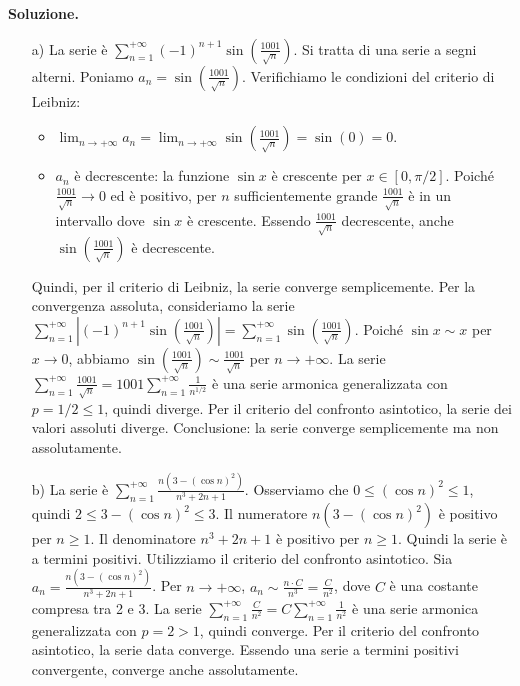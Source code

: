 \documentclass[12pt, a4paper]{article}
\newenvironment{solution}{%
    \par\noindent\textbf{Soluzione.}\medskip\par
    \normalfont
}{\par\bigskip}
\begin{document}
\begin{solution}
\begin{enumerate}
    \item[a)] La serie è $\displaystyle\sum_{n=1}^{+\infty} (-1)^{n+1} \sin\left(\frac{1001}{\sqrt{n}}\right)$.
    Si tratta di una serie a segni alterni. Poniamo $a_n = \sin\left(\frac{1001}{\sqrt{n}}\right)$.
    Verifichiamo le condizioni del criterio di Leibniz:
    \begin{itemize}
        \item $\lim_{n\to+\infty} a_n = \lim_{n\to+\infty} \sin\left(\frac{1001}{\sqrt{n}}\right) = \sin(0) = 0$.
        \item $a_n$ è decrescente: la funzione $\sin x$ è crescente per $x \in [0, \pi/2]$. Poiché $\frac{1001}{\sqrt{n}} \to 0$ ed è positivo, per $n$ sufficientemente grande $\frac{1001}{\sqrt{n}}$ è in un intervallo dove $\sin x$ è crescente. Essendo $\frac{1001}{\sqrt{n}}$ decrescente, anche $\sin\left(\frac{1001}{\sqrt{n}}\right)$ è decrescente.
    \end{itemize}
    Quindi, per il criterio di Leibniz, la serie converge semplicemente.
    Per la convergenza assoluta, consideriamo la serie $\displaystyle\sum_{n=1}^{+\infty} \left|(-1)^{n+1} \sin\left(\frac{1001}{\sqrt{n}}\right)\right| = \sum_{n=1}^{+\infty} \sin\left(\frac{1001}{\sqrt{n}}\right)$.
    Poiché $\sin x \sim x$ per $x \to 0$, abbiamo $\sin\left(\frac{1001}{\sqrt{n}}\right) \sim \frac{1001}{\sqrt{n}}$ per $n \to +\infty$.
    La serie $\displaystyle\sum_{n=1}^{+\infty} \frac{1001}{\sqrt{n}} = 1001 \sum_{n=1}^{+\infty} \frac{1}{n^{1/2}}$ è una serie armonica generalizzata con $p=1/2 \le 1$, quindi diverge.
    Per il criterio del confronto asintotico, la serie dei valori assoluti diverge.
    Conclusione: la serie converge semplicemente ma non assolutamente.

    \item[b)] La serie è $\displaystyle\sum_{n=1}^{+\infty} \frac{n(3-(\cos n)^{2})}{n^{3}+2n+1}$.
    Osserviamo che $0 \le (\cos n)^2 \le 1$, quindi $2 \le 3-(\cos n)^2 \le 3$.
    Il numeratore $n(3-(\cos n)^2)$ è positivo per $n \ge 1$. Il denominatore $n^3+2n+1$ è positivo per $n \ge 1$.
    Quindi la serie è a termini positivi.
    Utilizziamo il criterio del confronto asintotico. Sia $a_n = \frac{n(3-(\cos n)^{2})}{n^{3}+2n+1}$.
    Per $n \to +\infty$, $a_n \sim \frac{n \cdot C}{n^3} = \frac{C}{n^2}$, dove $C$ è una costante compresa tra 2 e 3.
    La serie $\displaystyle\sum_{n=1}^{+\infty} \frac{C}{n^2} = C \sum_{n=1}^{+\infty} \frac{1}{n^2}$ è una serie armonica generalizzata con $p=2 > 1$, quindi converge.
    Per il criterio del confronto asintotico, la serie data converge.
    Essendo una serie a termini positivi convergente, converge anche assolutamente.


\end{enumerate}
\end{solution}
\end{document}
